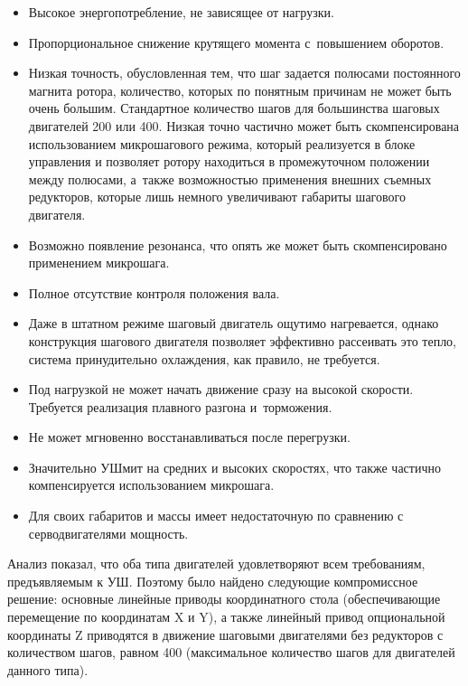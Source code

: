 \begin{itemize}
	\item Высокое энергопотребление, не зависящее от нагрузки.
	
	\item Пропорциональное снижение крутящего момента с~повышением оборотов.
	
	\item Низкая точность, обусловленная тем, что шаг задается полюсами постоянного магнита ротора, количество, которых по понятным причинам не может быть очень большим. Стандартное количество шагов для большинства шаговых двигателей 200 или 400. Низкая точно частично может быть скомпенсирована использованием микрошагового режима, который реализуется в блоке управления и позволяет ротору находиться в промежуточном положении между полюсами, а~также возможностью применения внешних съемных редукторов, которые лишь немного увеличивают габариты шагового двигателя.
	
	\item Возможно появление резонанса, что опять же может быть скомпенсировано применением микрошага.
	
	\item Полное отсутствие контроля положения вала.
	
	\item Даже в штатном режиме шаговый двигатель ощутимо нагревается, однако конструкция шагового двигателя позволяет эффективно рассеивать это тепло, система принудительно охлаждения, как правило, не требуется.
	
	\item Под нагрузкой не может начать движение сразу на высокой скорости. Требуется реализация плавного разгона и~торможения.
	
	\item Не может мгновенно восстанавливаться после перегрузки.
	
	\item Значительно УШмит на средних и высоких скоростях, что также частично компенсируется использованием микрошага.
	
	\item Для своих габаритов и массы имеет недостаточную по сравнению с серводвигателями мощность.
\end{itemize}

Анализ показал, что оба типа двигателей удовлетворяют всем требованиям, предъявляемым к УШ. Поэтому было найдено следующие компромиссное решение: основные линейные приводы координатного стола (обеспечивающие перемещение по координатам X и Y), а также линейный привод опциональной координаты Z приводятся в движение шаговыми двигателями без редукторов с количеством шагов, равном 400 (максимальное количество шагов для двигателей данного типа).

